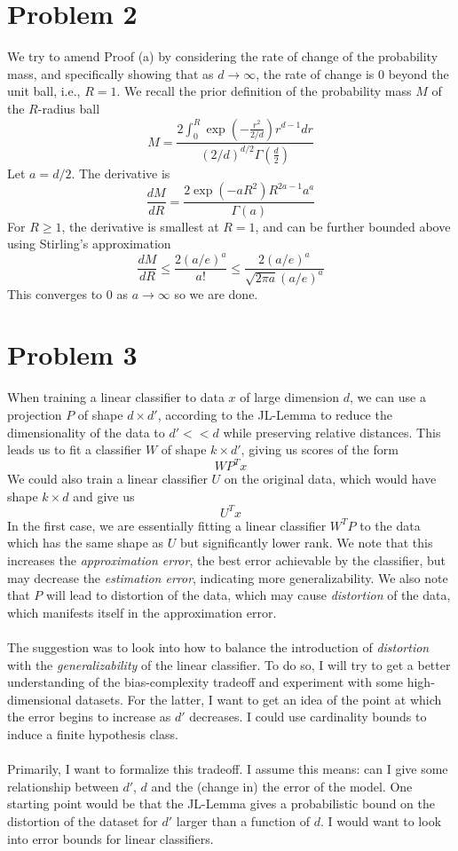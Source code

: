 \documentclass[a4paper,13pt]{article}
\begin{document}
\section*{Problem 2}

We try to amend Proof (a) by considering the rate of change of the probability mass, and specifically showing that as $d \rightarrow \infty$, the rate of change is 0 beyond the unit ball, i.e., $R=1$. We recall the prior definition of the probability mass $M$ of the $R$-radius ball
$$M = \frac{2 \int_0^R \exp \left(-\frac{r^2}{2/d} \right) r^{d-1} dr }{(2/d)^{d/2} \Gamma \left( \frac{d}{2} \right)}$$
Let $a = d/2$. The derivative is 
$$\frac{dM}{dR} = \frac{2 \exp \left( -a R^2 \right)  R^{2a-1} a^a}{\Gamma \left( a \right)}$$
For $R \geq 1$, the derivative is smallest at $R = 1$, and can be further bounded above using Stirling's approximation
$$\frac{dM}{dR} \leq \frac{2 \left(a/e \right)^a}{ a!} \leq \frac{2 \left(a/e \right)^a}{\sqrt{2 \pi a} (a/e)^a}$$
This converges to $0$ as $a \rightarrow \infty$ so we are done.

\section*{Problem 3}
When training a linear classifier to data $x$ of large dimension $d$, we can use a projection $P$ of shape $d \times d'$, according to the JL-Lemma to reduce the dimensionality of the data to $d' << d$ while preserving relative distances. This leads us to fit a classifier $W$ of shape $k \times d'$, giving us scores of the form
$$WP^T x$$
We could also train a linear classifier $U$ on the original data, which would have shape $k \times d$ and give us
$$U^T x$$
In the first case, we are essentially fitting a linear classifier $W^TP$ to the data which has the same shape as $U$ but significantly lower rank. We note that this increases the \textit{approximation error}, the best error achievable by the classifier, but may decrease the \textit{estimation error}, indicating more generalizability. We also note that $P$ will lead to distortion of the data, which may cause \textit{distortion} of the data, which manifests itself in the approximation error.
\\\\
The suggestion was to look into how to balance the introduction of \textit{distortion} with the \textit{generalizability} of the linear classifier. To do so, I will try to get a better understanding of the bias-complexity tradeoff and experiment with some high-dimensional datasets. For the latter, I want to get an idea of the point at which the error begins to increase as $d'$ decreases. I could use cardinality bounds to induce a finite hypothesis class.
\\\\
Primarily, I want to formalize this tradeoff. I assume this means: can I give some relationship between $d'$, $d$ and the (change in) the error of the model. One starting point would be that the JL-Lemma gives a probabilistic bound on the distortion of the dataset for $d'$ larger than a function of $d$. I would want to look into error bounds for linear classifiers.
\end{document}
